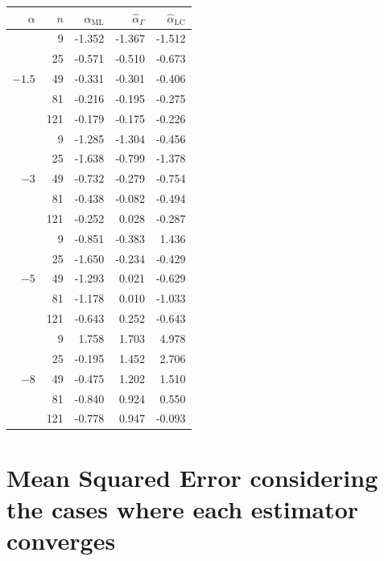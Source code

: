 \documentclass[10pt,a4paper]{article}
\begin{document}
\begin{minipage}{0.5\linewidth}
\begin{tabular}{rrrrr}
	\toprule
	$\alpha$ & $n$ & $\widehat{\alpha}_{\text{ML}}$ & $\widehat{\alpha}_{\Gamma}$ & $\widehat{\alpha}_{\text{LC}}$\\  
	\midrule
	\multirow{5 }{*}{$-1.5$} 
	& 9 & -1.352 & -1.367 & -1.512 \\ 
	& 25 & -0.571 & -0.510 & -0.673 \\ 
	& 49 & -0.331 & -0.301 & -0.406 \\ 
	& 81 & -0.216 & -0.195 & -0.275 \\ 
	& 121 & -0.179 & -0.175 & -0.226 \\ 
	\midrule
	\multirow{5 }{*}{$-3$}
	& 9 & -1.285 & -1.304 & -0.456 \\ 
	& 25 & -1.638 & -0.799 & -1.378 \\ 
	& 49 & -0.732 & -0.279 & -0.754 \\ 
	& 81 & -0.438 & -0.082 & -0.494 \\ 
	& 121 & -0.252 & 0.028 & -0.287 \\ 
	\midrule
	\multirow{5 }{*}{$-5$}
	& 9 & -0.851 & -0.383 & 1.436 \\ 
	& 25 & -1.650 & -0.234 & -0.429 \\ 
	& 49 & -1.293 & 0.021 & -0.629 \\ 
	& 81 & -1.178 & 0.010 & -1.033 \\ 
	& 121 & -0.643 & 0.252 & -0.643 \\
	\midrule
	\multirow{5 }{*}{$-8$} 
	& 9 & 1.758 & 1.703 & 4.978 \\ 
	& 25 & -0.195 & 1.452 & 2.706 \\ 
	& 49 & -0.475 & 1.202 & 1.510 \\ 
	& 81 & -0.840 & 0.924 & 0.550 \\ 
	& 121 & -0.778 & 0.947 & -0.093 \\ 
	\bottomrule
\end{tabular}
\end{minipage}

\vspace{1cm}

\section{Mean Squared Error considering the cases where each estimator converges}
\end{document}
